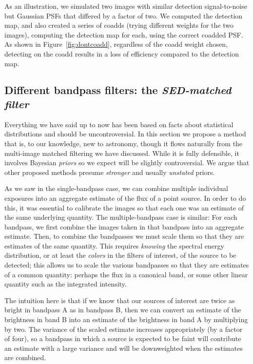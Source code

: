 \documentclass[11pt,letterpaper,linenumbers]{aastex7}
\newcommand{\figref}[1]{\mbox{Figure~\ref{#1}}}
\begin{document}
As an illustration, we simulated two images with similar detection
signal-to-noise but Gaussian PSFs that differed by a factor of two.
We computed the detection map, and also created a series of coadds
(trying different weights for the two images), computing the detection
map for each, using the correct coadded PSF.  As shown in \figref{fig:dontcoadd},
regardless of the coadd weight chosen, detecting
on the coadd results in a loss of efficiency compared to the detection
map.


\subsection{Different bandpass filters: the \emph{SED-matched filter}}
\label{sec:sedmatched}

Everything we have said up to now has been based on facts about
statistical distributions and should be uncontroversial.  In this
section we propose a method that is, to our knowledge, new to
astronomy, though it flows naturally from the multi-image matched
filtering we have discussed. While it is fully defensible, it involves
Bayesian \emph{priors} so we expect will be slightly controversial.  We argue
that other proposed methods presume \emph{stronger} and usually
\emph{unstated} priors.

As we saw in the single-bandpass case, we can combine multiple
individual exposures into an aggregate estimate of the flux of a point
source.  In order to do this, it was essential to calibrate the images
so that each one was an estimate of the same underlying quantity.  The
multiple-bandpass case is similar: For each bandpass, we first combine
the images taken in that bandpass into an aggregate estimate.  Then,
to combine the bandpasses we must scale them so that they are
estimates of the same quantity.  This requires \emph{knowing} the
spectral energy distribution, or at least the \emph{colors} in the
filters of interest, of the source to be detected; this allows us to
scale the various bandpasses so that they are estimates of a common
quantity: perhaps the flux in a canonical band, or some other linear
quantity such as the integrated intensity.

The intuition here is that if we know that our sources of interest are
twice as bright in bandpass A as in bandpass B, then we can convert an
estimate of the brightness in band B into an estimate of the
brightness in band A by multiplying by two.  The variance of the
scaled estimate increases appropriately (by a factor of four), so a
bandpass in which a source is expected to be faint will contribute an
estimate with a large variance and will be downweighted when the
estimates are combined.
\end{document}
